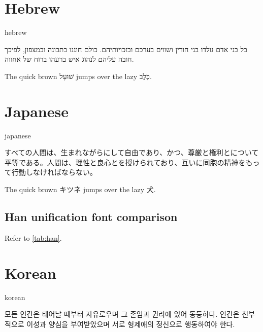 \documentclass[11pt, a4paper]{article}
\begin{document}
	\section{Hebrew}

		\begin{selectlanguage}{hebrew}
			\begin{displayquote}
				כל בני אדם נולדו בני חורין ושווים בערכם ובזכויותיהם. כולם חוננו בתבונה ובמצפון, לפיכך חובה עליהם לנהוג איש ברעהו ברוח של אחווה.
			\end{displayquote}
		\end{selectlanguage}

		The quick brown \foreignlanguage{hebrew}{שׁוּעָל} jumps over the lazy \foreignlanguage{hebrew}{כֶּלֶב}.

	\section{Japanese}

		\begin{selectlanguage}{japanese}
			\begin{displayquote}
				すべての人間は、生まれながらにして自由であり、かつ、尊厳と権利とについて平等である。人間は、理性と良心とを授けられており、互いに同胞の精神をもって行動しなければならない。
			\end{displayquote}
		\end{selectlanguage}

		The quick brown \foreignlanguage{japanese}{キツネ} jumps over the lazy \foreignlanguage{japanese}{犬}.

		\subsection{Han unification font comparison}

			Refer to \autoref{tab:han}.

	\section{Korean}

		\begin{selectlanguage}{korean}
			\begin{displayquote}
				모든 인간은 태어날 때부터 자유로우며 그 존엄과 권리에 있어 동등하다. 인간은 천부적으로 이성과 양심을 부여받았으며 서로 형제애의 정신으로 행동하여야 한다.
			\end{displayquote}
		\end{selectlanguage}
\end{document}
